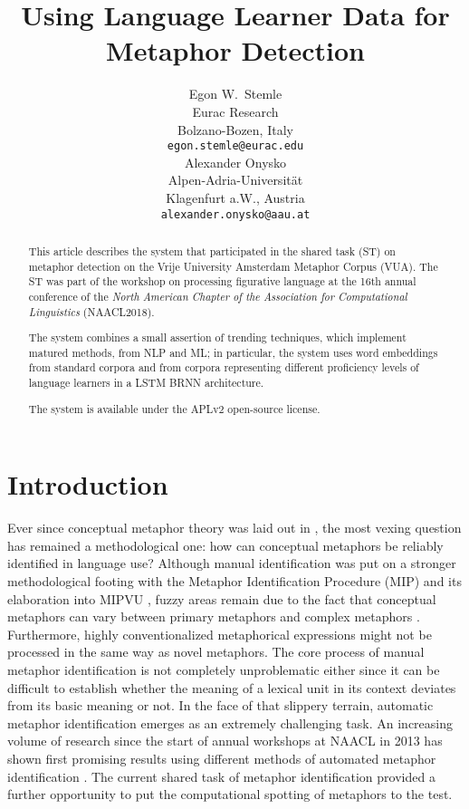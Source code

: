 \documentclass[11pt,a4paper]{article}
\title{Using Language Learner Data for Metaphor Detection}
\author{Egon W.~Stemle \\
  Eurac Research \\
  Bolzano-Bozen, Italy \\
  {\tt egon.stemle@eurac.edu} \\\And
  Alexander Onysko \\
  Alpen-Adria-Universität \\
  Klagenfurt a.W., Austria \\
  {\tt alexander.onysko@aau.at} \\}
\date{}
\begin{document}
\maketitle
\begin{abstract}
This article describes the system that participated in the shared task (ST) on metaphor detection \cite{Leong2018} on the Vrije University Amsterdam Metaphor Corpus (VUA).
The ST was part of the workshop on processing figurative language at the 16th annual conference of the \emph{North American Chapter of the Association for Computational Linguistics} (NAACL2018).

The system combines a small assertion of trending techniques, which implement matured methods, from NLP and ML; 
in particular, the system uses word embeddings from standard corpora and from corpora representing different proficiency levels of language learners in a LSTM BRNN architecture.

The system is available under the APLv2 open-source license.
\end{abstract}


\section{Introduction} %
\label{sec:intro}
 
Ever since conceptual metaphor theory was laid out in , the most vexing question has remained a methodological one: how can conceptual metaphors be reliably identified in language use? Although manual identification was put on a stronger methodological footing with the Metaphor Identification Procedure (MIP) \cite{doi:10.1080/10926480709336752} and its elaboration into MIPVU \cite{Steen2010}, fuzzy areas remain due to the fact that conceptual metaphors can vary between primary metaphors and complex metaphors \cite[cf.][]{Grady1997}. 
Furthermore, highly conventionalized metaphorical expressions might not be processed in the same way as novel metaphors. The core process of manual metaphor identification is not completely unproblematic either since it can be difficult to establish whether the meaning of a lexical unit in its context deviates from its basic meaning or not. 
In the face of that slippery terrain, automatic metaphor identification emerges as an extremely challenging task. 
An increasing volume of research since the start of annual workshops at NAACL in 2013 has shown first promising results using different methods of automated metaphor identification \cite[cf.~for example][]{%
W15-1400,W16-1100}.
The current shared task of metaphor identification provided a further opportunity to put the computational spotting of metaphors to the test.
\end{document}
